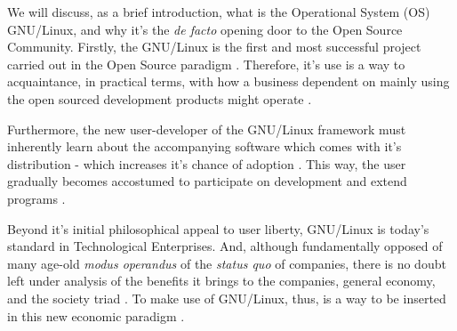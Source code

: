 \documentclass[
12pt,				%
openright,			%
oneside,			%
a4paper,			%
brazil,				%
english,			%
]{abntex2}
\begin{document}
We will discuss, as a brief introduction, what is the Operational System
(OS) GNU/Linux, and why it's the \textit{de facto} opening door to the
Open Source Community. Firstly, the GNU/Linux is the first and most
successful project carried out in the Open Source paradigm
\cite{tu2000evolution,west2001open}. Therefore, it's use is a way to
acquaintance, in practical terms, with how a business dependent on mainly
using the open sourced development products might operate \cite{fink2003business}.   

Furthermore, the new user-developer of the GNU/Linux framework must
inherently learn about the accompanying software which comes with it's
distribution - which increases it's chance of adoption
\cite{west2001open}. This way, the user gradually becomes accostumed to
participate on development and extend programs \cite{hertel2003motivation}.

Beyond it's initial philosophical appeal to user liberty, GNU/Linux is
today's standard in Technological Enterprises. And, although
fundamentally opposed of many age-old \textit{modus operandus} of the
\textit{status quo} of companies, there is no doubt left under
analysis of the benefits it brings to the companies, general economy, and
the society triad \cite{moody2009rebel}. To make use of GNU/Linux,
thus, is a way to be inserted in this new economic paradigm \cite{hippel2003open,peters2009open}.
\end{document}
